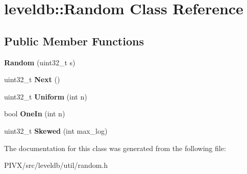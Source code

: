 \hypertarget{classleveldb_1_1_random}{}\section{leveldb\+:\+:Random Class Reference}
\label{classleveldb_1_1_random}
\subsection*{Public Member Functions}
\begin{DoxyCompactItemize}
\item 
\mbox{\label{classleveldb_1_1_random_a1c0c29265d466774943d8e3769abc411}} 
{\bfseries Random} (uint32\+\_\+t s)
\item 
\mbox{\label{classleveldb_1_1_random_a9e00ef1fcc82ed0ad16ba91b30ae8038}} 
uint32\+\_\+t {\bfseries Next} ()
\item 
\mbox{\label{classleveldb_1_1_random_a9281323c3f115fa47a0f329f72ad2a80}} 
uint32\+\_\+t {\bfseries Uniform} (int n)
\item 
\mbox{\label{classleveldb_1_1_random_abed35e25c0e08c2c4cb6d06b62cd1b73}} 
bool {\bfseries One\+In} (int n)
\item 
\mbox{\label{classleveldb_1_1_random_a41987dcc7818d7bc0e68e2418c51d94e}} 
uint32\+\_\+t {\bfseries Skewed} (int max\+\_\+log)
\end{DoxyCompactItemize}


The documentation for this class was generated from the following file\+:\begin{DoxyCompactItemize}
\item 
P\+I\+V\+X/src/leveldb/util/random.\+h\end{DoxyCompactItemize}
